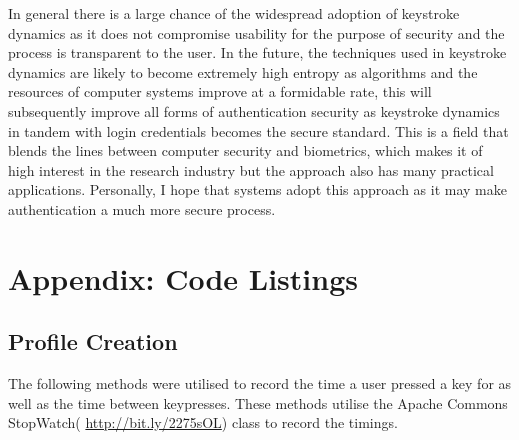 \documentclass{article}
\begin{document}
In general there is a large chance of the widespread adoption of keystroke dynamics as it does not compromise usability for the purpose of security and the process is transparent to the user. In the future, the techniques used in keystroke dynamics are likely to become extremely high entropy as algorithms and the resources of computer systems improve at a formidable rate, this will subsequently improve all forms of authentication security as keystroke dynamics in tandem with login credentials becomes the secure standard. This is a field that blends the lines between computer security and biometrics, which makes it of high interest in the research industry but the approach also has many practical applications. Personally, I hope that systems adopt this approach as it may make authentication a much more secure process.  

\section{Appendix: Code Listings} \label{appendix}

\subsection{Profile Creation}
The following methods were utilised to record the time a user pressed a key for as well as the time between keypresses. These methods utilise the Apache Commons StopWatch( \url{http://bit.ly/2275sOL}) class to record the timings.  
\end{document}
